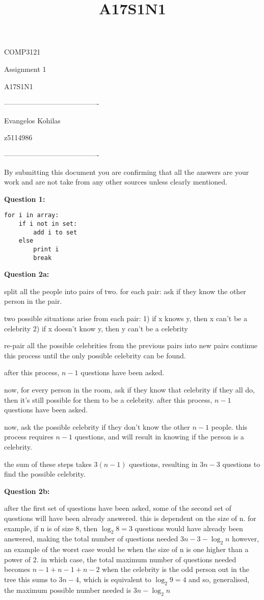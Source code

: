 \documentclass{article}
\title{A17S1N1}
\begin{document}
\begin{LARGE}
\begin{center}

COMP3121

Assignment 1

A17S1N1

----------------------------------------

Evangelos Kohilas

z5114986

----------------------------------------

By submitting this document you are confirming that all the answers are your work and are not take from any other sources unless clearly mentioned.

\end{center}
\end{LARGE}

\textbf{Question 1:}

\begin{verbatim}
for i in array:
    if i not in set:
        add i to set
    else
        print i
        break
\end{verbatim}

\textbf{Question 2a:}

split all the people into pairs of two.
for each pair:
    ask if they know the other person in the pair.

two possible situations arise from each pair:
1) if x knows y, then x can't be a celebrity
2) if x doesn't know y, then y can't be a celebrity

re-pair all the possible celebrities from the previous pairs into new pairs
continue this process until the only possible celebrity can be found.

after this process, \(n-1\) questions have been asked.

now, for every person in the room, ask if they know that celebrity
if they all do, then it's still possible for them to be a celebrity.
after this process, \(n-1\) questions have been asked.

now, ask the possible celebrity if they don't know the other \(n-1\) people.
this process requires \(n-1\) questions, and will result in knowing if the person is a celebrity.

the sum of these steps takes \(3(n-1)\) questions, resulting in \(3n - 3\) questions to find the possible celebrity.

\textbf{Question 2b:}

after the first set of questions have been asked, some of the second set of questions will have been already answered.
this is dependent on the size of n.
for example, if n is of size 8, then \(\log_2 8 = 3\) questions would have already been answered, making the total number of questions needed \(3n - 3 - \log_2 n\)
however, an example of the worst case would be when the size of n is one higher than a power of 2.
in which case, the total maximum number of questions needed becomes \(n-1 + n-1 + n-2\) when the celebrity is the odd person out in the tree
this sums to \(3n - 4\), which is equivalent to \(\log_2 9 = 4\)
and so, generalised, the maximum possible number needed is \(3n - \log_2 n\)
\end{document}
